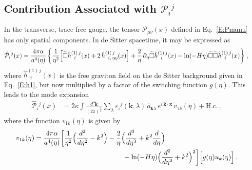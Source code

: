 \documentclass[preprint,prd,showpacs,superscriptaddress]{revtex4}
\begin{document}
\subsection{Contribution Associated with $\mathcal{P}_{i}{}^{j}$}

In the  transverse, trace-free gauge, the tensor $\mathcal{P}_{\mu\nu}(x)$ defined in Eq.~\eqref{E:Pmunu} has only
spatial components. In de Sitter spacetime, it may be expressed as
\begin{equation}
	\hat{\mathcal{P}}_{i}{}^{j}(x)=\frac{4\pi\alpha}{a^{4}(\eta)}\left\{\frac{1}{\eta^{2}}\Bigl[\widetilde{\square}\hat{h}^{(1)\,j}_{\;\;i}(x)+
	2\,\hat{h}^{(1)\,j}_{\;\;i,\,\eta\eta}(x)\Bigr]+\frac{2}{\eta}\,{\partial}_{\eta}\widetilde{\square}\hat{h}^{(1)\,j}_{\;\;i}(x)-
	\ln(-H\eta)\widetilde{\square}\widetilde{\square}\hat{h}^{(1)\,j}_{\;\;i}(x)\right\}\,,
\end{equation}
 where $\hat{h}^{(1)\,j}_{\;\;i}(x)$   is the free graviton field on the de Sitter background given in Eq.~\eqref{E:h1}, 
 but now multiplied by a factor of the switching function $g(\eta)$. This leads to the mode expansion 
\begin{align}
	\hat{\mathcal{P}}_{i}{}^{j}(x)&=2\kappa\int\!\frac{d^{3}\mathbf{k}}{(2\pi)^{\frac{3}{2}}}\sum_{\lambda}
	\varepsilon_{i}{}^{j}(\mathbf{k},\lambda)\,\hat{a}_{\mathbf{k}\lambda}\,e^{i\,\mathbf{k}\cdot\mathbf{x}}\,
	v_{1k}(\eta)+\mathrm{H.c.}\,,
\label{E:P1-expand}	
\end{align}
where the function $v_{1k}(\eta)$ is given by
\begin{align}\label{E:v1}
	v_{1k}(\eta)&=\frac{4\pi\alpha}{a^{4}(\eta)}\biggl[\frac{1}{\eta^{2}}\Bigl(\frac{d^{2}}{d\eta^{2}}-
	k^{2}\Bigr)-\frac{2}{\eta}\Bigl(\frac{d^{3}}{d\eta^{3}}+k^{2}\frac{d}{d\eta}\Bigr)\biggr.\notag\\
	&\qquad\qquad\qquad\qquad\qquad\qquad\quad-\biggl.\ln(-H\eta)\Bigl(\frac{d^{2}}{d\eta^{2}}+k
	^{2}\Bigr)^{2}\biggr]\Bigl[g(\eta)u_k(\eta)\Bigr]\,.
\end{align}
\end{document}
